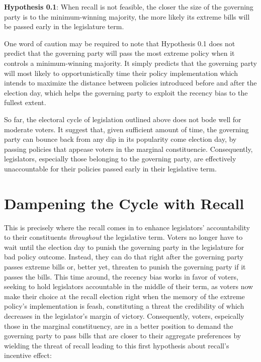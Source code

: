 \documentclass{article}
\begin{document}
		\textbf{Hypothesis 0.1}: When recall is not feasible,
		the closer the size of the governing party is to the minimum-winning majority,
		the more likely its extreme bills will be passed early in the legislature term.
		
		One word of caution may be required
		to note that
		Hypothesis 0.1 does not predict that
		the governing party will pass the most extreme policy
		when it controls a minimum-winning majority.
		It simply predicts that
		the governing party will most likely to opportunistically
		time their policy implementation
		which intends to maximize the distance between
		policies introduced before and after the election day,
		which helps the governing party to exploit the recency bias
		to the fullest extent.
		
		So far, the electoral cycle of legislation outlined above
		does not bode well for moderate voters.
		It suggest that,
		given sufficient amount of time,
		the governing party can bounce back from
		any dip in its popularity come election day,
		by passing policies that appease voters in the marginal constituencie.
		Consequently,
		legislators, especially those belonging to the governing party,
		are effectively unaccountable for their policies
		passed early in their legislative term.
		
		
		
	
	
	\section*{Dampening the Cycle with Recall}
		
		This is precisely where the recall comes in
		to enhance legislators' accountability to their constituents
		\textit{throughout} the legislative term.
		Voters no longer have to wait until the election day
		to punish the governing party in the legislature for bad policy outcome.
		Instead,
		they can do that right after the governing party passes extreme bills or,
		better yet,
		threaten to punish the governing party if it passes the bills.
		This time around,
		the recency bias works in favor of voters,
		seeking to hold legislators accountable in the middle of their term,
		as voters now make their choice at the recall election
		right when the memory of the extreme policy's implementation is feash,
		constituting a threat the credibility of which decreases in the
		legislator's margin of victory.
		Consequently,
		voters,
		espeically those in the marginal constituency,
		are in a better position to
		demand the governing party to pass bills that
		are closer to their aggregate preferences
		by wielding the threat of recall leading to this first hypothesis
		about recall's incentive effect:
		
\end{document}
